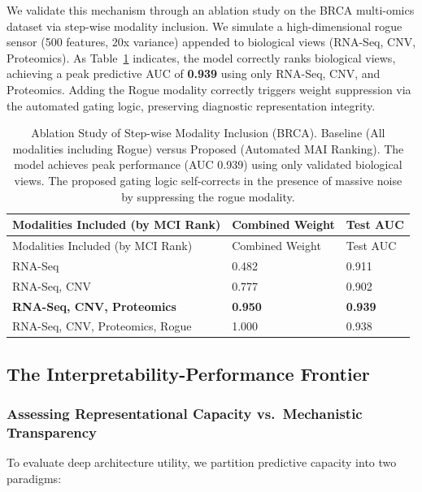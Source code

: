 \documentclass[
  letterpaper,
]{report}
\begin{document}
We validate this mechanism through an ablation study on the BRCA
multi-omics dataset via step-wise modality inclusion. We simulate a
high-dimensional rogue sensor (500 features, 20x variance) appended to
biological views (RNA-Seq, CNV, Proteomics). As
Table~\ref{tbl-brca-stepwise} indicates, the model correctly ranks
biological views, achieving a peak predictive AUC of \textbf{0.939}
using only RNA-Seq, CNV, and Proteomics. Adding the Rogue modality
correctly triggers weight suppression via the automated gating logic,
preserving diagnostic representation integrity.

\begin{longtable}[]{@{}lll@{}}
\caption{Ablation Study of Step-wise Modality Inclusion (BRCA). Baseline
(All modalities including Rogue) versus Proposed (Automated MAI
Ranking). The model achieves peak performance (AUC 0.939) using only
validated biological views. The proposed gating logic self-corrects in
the presence of massive noise by suppressing the rogue
modality.}\label{tbl-brca-stepwise}\tabularnewline
\toprule\noalign{}
Modalities Included (by MCI Rank) & Combined Weight & Test AUC \\
\midrule\noalign{}
\endfirsthead
\toprule\noalign{}
Modalities Included (by MCI Rank) & Combined Weight & Test AUC \\
\midrule\noalign{}
\endhead
\bottomrule\noalign{}
\endlastfoot
RNA-Seq & 0.482 & 0.911 \\
RNA-Seq, CNV & 0.777 & 0.902 \\
\textbf{RNA-Seq, CNV, Proteomics} & \textbf{0.950} & \textbf{0.939} \\
RNA-Seq, CNV, Proteomics, Rogue & 1.000 & 0.938 \\
\end{longtable}

\subsection{The Interpretability-Performance
Frontier}\label{the-interpretability-performance-frontier}

\subsubsection{Assessing Representational Capacity vs.~Mechanistic
Transparency}\label{assessing-representational-capacity-vs.-mechanistic-transparency}

To evaluate deep architecture utility, we partition predictive capacity
into two paradigms:
\end{document}
